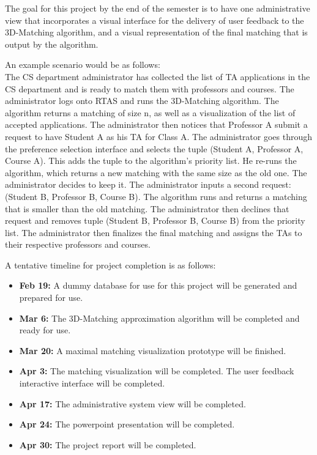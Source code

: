 The goal for this project by the end of the semester is to have one administrative view that incorporates a visual interface for the delivery of user feedback to the 3D-Matching algorithm, and a visual representation of the final matching that is output by the algorithm. 

An example scenario would be as follows:
\\
The CS department administrator has collected the list of TA applications in the CS department and is ready to match them with professors and courses. The administrator logs onto RTAS and runs the 3D-Matching algorithm. The algorithm returns a matching of size n, as well as a visualization of the list of accepted applications. The administrator then notices that Professor A submit a request to have Student A as his TA for Class A. The administrator goes through the preference selection interface and selects the tuple (Student A, Professor A, Course A). This adds the tuple to the algorithm's priority list. He re-runs the algorithm, which returns a new matching with the same size as the old one. The administrator decides to keep it. The administrator inputs a second request: (Student B, Professor B, Course B). The algorithm runs and returns a matching that is smaller than the old matching. The administrator then declines that request and removes tuple (Student B, Professor B, Course B) from the priority list. The administrator then finalizes the final matching and assigns the TAs to their respective professors and courses. 

A tentative timeline for project completion is as follows:

\begin{itemize} 
	\item{\textbf{Feb 19:} A dummy database for use for this project will be generated and prepared for use.} 
	
	\item{\textbf{Mar 6:} The 3D-Matching approximation algorithm will be completed and ready for use.}
	
	\item{\textbf{Mar 20:} A maximal matching visualization prototype will be finished.}
	
	\item{\textbf{Apr 3:} The matching visualization will be completed. The user feedback interactive interface will be completed.}
	
	\item{\textbf{Apr 17:} The administrative system view will be completed.}
	
	\item{\textbf{Apr 24:} The powerpoint presentation will be completed.}
	
	\item{\textbf{Apr 30:} The project report will be completed.}
	
\end{itemize}
